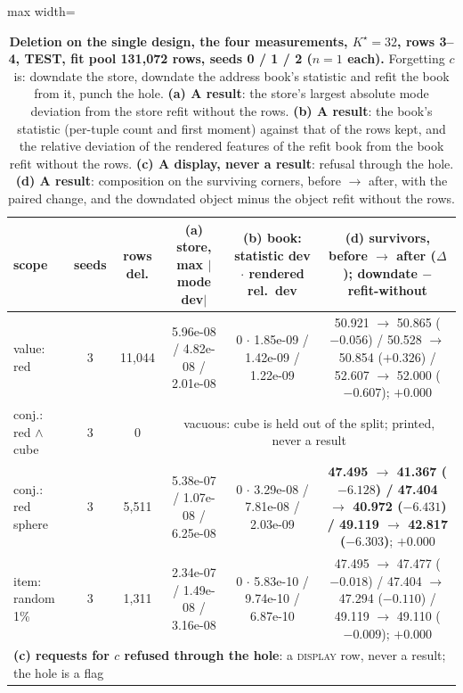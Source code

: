 \documentclass{article} %
\newcommand{\Kstar}{\ensuremath{K^{\star}}}
\begin{document}
\begin{table}[t]
\centering\small
\caption{\textbf{Deletion on the single design, the four measurements, $\Kstar=32$, rows 3--4, TEST, fit %
pool 131,072 rows, seeds 0 / 1 / 2 ($n=1$ each).} Forgetting $c$ is: downdate the store, downdate
the address book's statistic and refit the book from it, punch the hole. \textbf{(a) A result}: the
store's largest absolute mode deviation from the store refit without the rows. \textbf{(b) A
result}: the book's statistic (per-tuple count and first moment) against that of the rows kept, and
the relative deviation of the rendered features of the refit book from the book refit without the
rows. \textbf{(c) A display, never a result}: refusal through the hole. \textbf{(d) A result}:
composition on the surviving corners, before $\to$ after, with the paired change, and the downdated
object minus the object refit without the rows.}
\label{tab:del}
\setlength{\tabcolsep}{2.4pt}
\begin{adjustbox}{max width=\linewidth}\begin{tabular}{lccccc}
\toprule
scope & seeds & rows del. & (a) store, max $|$mode dev$|$ & (b) book: statistic dev $\cdot$ rendered rel.\ dev & (d) survivors, before $\to$ after ($\Delta$); downdate $-$ refit-without \\
\midrule
value: red & 3 & 11,044 & 5.96e-08 / 4.82e-08 / 2.01e-08 & 0 $\cdot$ 1.85e-09 / 1.42e-09 / 1.22e-09 & 50.921 $\to$ 50.865 ($-0.056$) / 50.528 $\to$ 50.854 ($+0.326$) / 52.607 $\to$ 52.000 ($-0.607$); $+0.000$ \\
conj.: red $\wedge$ cube & 3 & 0 & \multicolumn{3}{c}{vacuous: cube is held out of the split; printed, never a result} \\
conj.: red sphere & 3 & 5,511 & 5.38e-07 / 1.07e-08 / 6.25e-08 & 0 $\cdot$ 3.29e-08 / 7.81e-08 / 2.03e-09 & \textbf{47.495 $\to$ 41.367 ($-6.128$) / 47.404 $\to$ 40.972 ($-6.431$) / 49.119 $\to$ 42.817 ($-6.303$)}; $+0.000$ \\
item: random 1\% & 3 & 1,311 & 2.34e-07 / 1.49e-08 / 3.16e-08 & 0 $\cdot$ 5.83e-10 / 9.74e-10 / 6.87e-10 & 47.495 $\to$ 47.477 ($-0.018$) / 47.404 $\to$ 47.294 ($-0.110$) / 49.119 $\to$ 49.110 ($-0.009$); $+0.000$ \\
\midrule
\multicolumn{6}{l}{\textbf{(c) requests for $c$ refused through the hole}: a \textsc{display} row, never a result; the hole is a flag} \\

\end{tabular}
\end{adjustbox}
\end{table}
\end{document}
